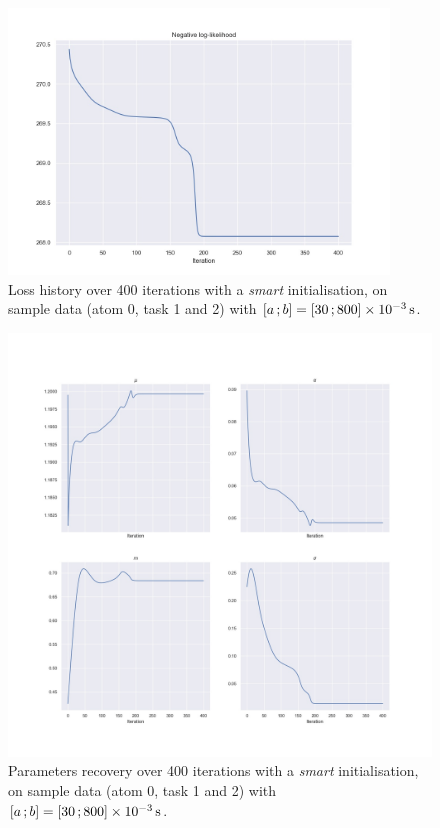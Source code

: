 \begin{figure}[h!]
    \centering
    \includegraphics[width=0.9\textwidth]{pics/results_sample/history_loss_atom_0_task_1_2.jpg}
    \caption{Loss history over 400 iterations with a \textit{smart} initialisation, on sample data (atom 0, task 1 and 2) with $\left[ a \, ; b \right] = \left[ 30 \, ; 800 \right]\times \SI{e-3}{\second}$.}
    \label{fig:history_loss_atom_0_task_1_2}
\end{figure}

\begin{figure}[h!]
    \centering
    \includegraphics[width=\textwidth]{pics/results_sample/history_params_atom_0_task_1_2.jpg}
    \caption{Parameters recovery over 400 iterations with a \textit{smart} initialisation, on sample data (atom 0, task 1 and 2) with $\left[ a \, ; b \right] = \left[ 30 \, ; 800 \right]\times \SI{e-3}{\second}$.}
    \label{fig:history_params_atom_0_task_1_2}
\end{figure}



